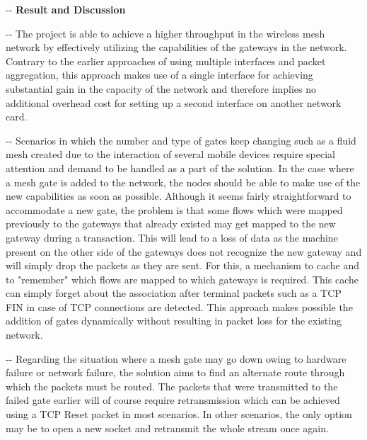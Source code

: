 \documentclass[12pt]{article}
\makeatletter
\newenvironment{indentation}[3]%
	{\par\setlength{\parindent}{#3}
	\setlength{\leftmargin}{#1}       \setlength{\rightmargin}{#1}%
	\advance\linewidth -\leftmargin       \advance\linewidth -\rightmargin%
	\advance\@totalleftmargin\leftmargin  \@setpar{{\@@par}}%
	\parshape 1\@totalleftmargin \linewidth\ignorespaces}{\par}%
\makeatother
\begin{document}
\pagebreak
\begin{indentation}{0pt}{0pt}{0pt}
\vspace{1cm}
\textbf{{{\Large Result and Discussion}}}
\end{indentation}
\vspace{0.5cm}

\begin{indentation}{0pt}{0pt}{0pt}
{\normalsize \hspace{1cm} The project is able to achieve a higher throughput in the wireless mesh network by effectively utilizing the capabilities of the gateways in the network. Contrary to the earlier approaches of using multiple interfaces and packet aggregation, this approach makes use of a single interface for achieving substantial gain in the capacity of the network and therefore implies no additional overhead cost for setting up a second interface on another network card.}
\end{indentation}

\begin{indentation}{0pt}{0pt}{0pt}
{\normalsize \hspace{1cm} Scenarios in which the number and type of gates keep changing such as a fluid mesh created due to the interaction of several mobile devices require special attention and demand to be handled as a part of the solution. In the case where a mesh gate is added to the network, the nodes should be able to make use of the new capabilities as soon as possible. Although it seems fairly straightforward to accommodate a new gate, the problem is that some flows which were mapped previously to the gateways that already existed may get mapped to the new gateway during a transaction. This will lead to a loss of data as the machine present on the other side of the gateways does not recognize the new gateway and will simply drop the packets as they are sent. For this, a mechanism to cache and to "remember" which flows are mapped to which gateways is required. This cache can simply forget about the association after terminal packets such as a TCP FIN in case of TCP connections are detected. This approach makes possible the addition of gates dynamically without resulting in packet loss for the existing network.}
\end{indentation}

\begin{indentation}{0pt}{0pt}{0pt}
{\normalsize \hspace{1cm} Regarding the situation where a mesh gate may go down owing to hardware failure or network failure, the solution aims to find an alternate route through which the packets must be routed. The packets that were transmitted to the failed gate earlier will of course require retransmission which can be achieved using a TCP Reset packet in most scenarios. In other scenarios, the only option may be to open a new socket and retransmit the whole stream once again.}
\end{indentation}
\end{document}
